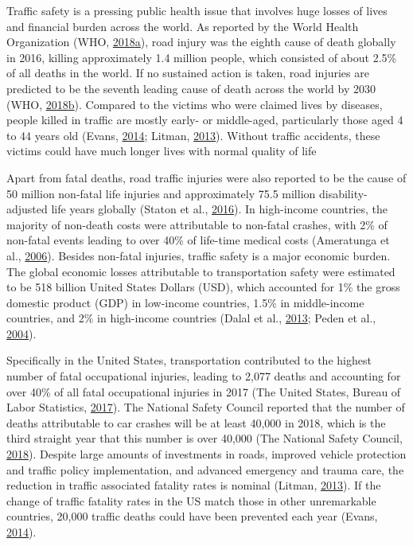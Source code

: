 \documentclass[12pt]{book}
\numberwithin{equation}{chapter}
\begin{document}
Traffic safety is a pressing public health issue that involves huge losses of lives and financial burden across the world.
As reported by the World Health Organization (WHO, \protect\hyperlink{ref-who2018}{2018}\protect\hyperlink{ref-who2018}{a}), road injury was the eighth cause of death globally in 2016, killing approximately 1.4 million people, which consisted of about 2.5\% of all deaths in the world.
If no sustained action is taken, road injuries are predicted to be the seventh leading cause of death across the world by 2030 (WHO, \protect\hyperlink{ref-who2018b}{2018}\protect\hyperlink{ref-who2018b}{b}).
Compared to the victims who were claimed lives by diseases, people killed in traffic are mostly early- or middle-aged, particularly those aged 4 to 44 years old (Evans, \protect\hyperlink{ref-evans2014traffic}{2014}; Litman, \protect\hyperlink{ref-litman2013transportation}{2013}).
Without traffic accidents, these victims could have much longer lives with normal quality of life

Apart from fatal deaths, road traffic injuries were also reported to be the cause of 50 million non-fatal life injuries and approximately 75.5 million disability-adjusted life years globally (Staton et al., \protect\hyperlink{ref-staton2016road}{2016}).
In high-income countries, the majority of non-death costs were attributable to non-fatal crashes, with 2\% of non-fatal events leading to over 40\% of life-time medical costs (Ameratunga et al., \protect\hyperlink{ref-ameratunga2006road}{2006}).
Besides non-fatal injuries, traffic safety is a major economic burden.
The global economic losses attributable to transportation safety were estimated to be 518 billion United States Dollars (USD), which accounted for 1\% the gross domestic product (GDP) in low-income countries, 1.5\% in middle-income countries, and 2\% in high-income countries (Dalal et al., \protect\hyperlink{ref-dalal2013economics}{2013}; Peden et al., \protect\hyperlink{ref-peden2004world}{2004}).

Specifically in the United States, transportation contributed to the highest number of fatal occupational injuries, leading to 2,077 deaths and accounting for over 40\% of all fatal occupational injuries in 2017 (The United States, Bureau of Labor Statistics, \protect\hyperlink{ref-bols}{2017}).
The National Safety Council reported that the number of deaths attributable to car crashes will be at least 40,000 in 2018, which is the third straight year that this number is over 40,000 (The National Safety Council, \protect\hyperlink{ref-nsc2018}{2018}).
Despite large amounts of investments in roads, improved vehicle protection and traffic policy implementation, and advanced emergency and trauma care, the reduction in traffic associated fatality rates is nominal (Litman, \protect\hyperlink{ref-litman2013transportation}{2013}).
If the change of traffic fatality rates in the US match those in other unremarkable countries, 20,000 traffic deaths could have been prevented each year (Evans, \protect\hyperlink{ref-evans2014traffic}{2014}).
\end{document}
